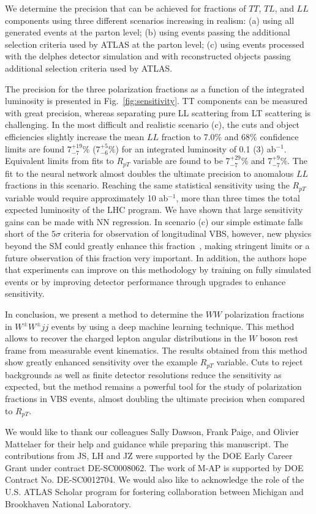 \documentclass[aps,prl,twocolumn,showpacs,superscriptaddress,groupeaddress,floatfix]{revtex4}
\def\ssWW{\ensuremath{ W^{\pm}W^{\pm}jj }\xspace}
\begin{document}
We determine the precision that can be achieved for fractions of $TT$, $TL$, and $LL$ components using three different scenarios increasing in realism: (a) using all  generated events at the parton level; 
(b) using events passing the additional selection criteria used by ATLAS at the parton level; 
(c) using events processed with the {\sc delphes} detector simulation and with reconstructed objects passing additional selection criteria used by \mbox{ATLAS}. 

The precision for the three polarization fractions as a function of the integrated luminosity is presented in Fig.~\ref{fig:sensitivity}. 
 TT components can be measured with great precision, whereas separating pure LL scattering from LT scattering is challenging.
In the most difficult and realistic scenario (c), the cuts and object efficiencies slightly increase the mean $LL$ fraction to 7.0\% and 68\% confidence limits are found 7$^{+19}_{-7}$\% (7$^{+5}_{-6}\%$) for an integrated luminosity of 0.1 (3) ab$^{-1}$.  Equivalent limits from fits to $R_{pT}$ variable are found to be 7$^{+29}_{-7}\%$ and 7$^{+9}_{-7}\%$. The fit to the neural network almost doubles the ultimate precision to anomalous $LL$ fractions in this scenario. Reaching the same statistical sensitivity using the $R_{pT}$ variable would require approximately 10 ab$^{-1}$, more than three times the total expected luminosity of the LHC program. We have shown that large sensitivity gains can be made with NN regression. In scenario (c) our simple estimate falls short of the $5\sigma$ criteria for observation of longitudinal VBS, however, new physics beyond the SM could greatly enhance this fraction~\cite{VLVLBSM}, making stringent limits or a future observation of this fraction very important. In addition, the authors hope that experiments can improve on this methodology by training on fully simulated events or by improving detector performance through upgrades to enhance sensitivity. 

In conclusion, we present a method to determine the $WW$ polarization fractions in
\ssWW events by using a deep machine learning technique.  This method
allows to recover the charged lepton angular distributions in the $W$
boson rest frame from measurable event kinematics.  The
results obtained from this method show greatly enhanced sensitivity over
the example $R_{pT}$ variable.  Cuts to reject
backgrounds as well as finite detector resolutions reduce the sensitivity as
expected, but the method remains a powerful tool for the study of
polarization fractions in VBS events, almost doubling the ultimate precision when compared to $R_{pT}$.

We would like to thank our colleagues Sally Dawson, Frank Paige, and Olivier Mattelaer for their help and guidance while preparing this manuscript.
The contributions from JS, LH and JZ were supported by the DOE Early Career Grant under contract DE-SC0008062. The work of M-AP is supported by DOE Contract No. DE-SC0012704. We would also like to acknowledge the role of the U.S. ATLAS Scholar program for fostering collaboration between Michigan and Brookhaven National Laboratory.


\end{document}
